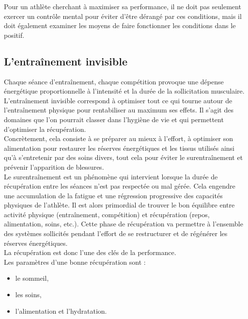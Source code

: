             Pour un athlète cherchant à maximiser sa performance, il ne doit pas seulement exercer un contrôle mental pour éviter d'être dérangé par ces conditions, mais il doit également examiner les moyens de faire fonctionner les conditions dans le positif.\\
            
             
             
        \subsection{L'entraînement invisible}
         
            Chaque séance d’entraînement, chaque compétition provoque une dépense énergétique proportionnelle à l’intensité et la durée de la sollicitation musculaire. \\
             
            L'entraînement invisible correspond à optimiser tout ce qui tourne autour de l'entraînement physique pour rentabiliser au maximum ses effets. Il s’agit des domaines que l’on pourrait classer dans l’hygiène de vie et qui permettent d'optimiser la récupération. \\
            
            Concrètement, cela consiste à se préparer au mieux à l’effort, à optimiser son alimentation pour restaurer les réserves énergétiques et les tissus utilisés ainsi qu'à s'entretenir par des soins divers, tout cela pour éviter le surentraînement et prévenir l'apparition de blessures.\\
            
            Le surentraînement est un phénomène qui intervient lorsque la durée de récupération entre les séances n’est pas respectée ou mal gérée. Cela engendre une accumulation de la fatigue et une régression progressive des capacités physiques de l'athlète. Il est alors primordial de trouver le bon équilibre entre activité physique (entraînement, compétition) et récupération (repos, alimentation, soins, etc.). Cette phase de récupération va permettre à l'ensemble des systèmes sollicités pendant l’effort de se restructurer et de régénérer les réserves énergétiques.\\
              
            La récupération est donc l'une des clés de la performance.\\
    
            Les paramètres d'une bonne récupération sont : 
             \begin{itemize}
                 \item le sommeil,
                 \item les soins,
                 \item l'alimentation et l'hydratation.
                
             \end{itemize}
             
